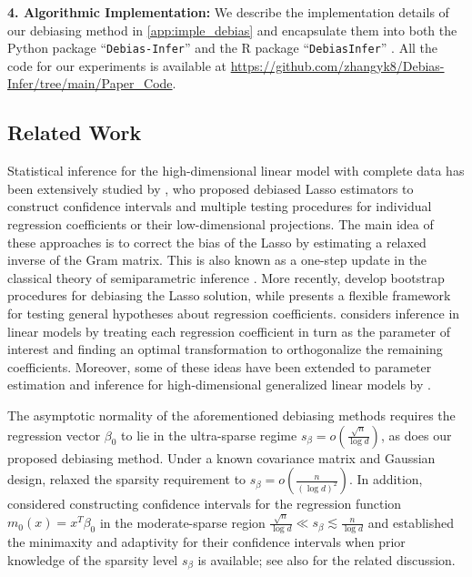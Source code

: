 \documentclass[ejsv2,noshowframe]{imsart}
\theoremstyle{plain}
\theoremstyle{definition}
\theoremstyle{remark}
\begin{document}
{\bf 4. Algorithmic Implementation:} We describe the implementation details of our debiasing method in \autoref{app:imple_debias} and encapsulate them into both the Python package ``\texttt{Debias-Infer}'' and the R package ``\texttt{DebiasInfer}'' \citep{DebiasInfer}. All the code for our experiments is available at \url{https://github.com/zhangyk8/Debias-Infer/tree/main/Paper_Code}. 

\subsection{Related Work}
\label{subsec:related_works}

Statistical inference for the high-dimensional linear model with complete data has been extensively studied by \cite{zhang2014confidence,van2014asymptotically,javanmard2014confidence,javanmard2014hypothesis,javanmard2018debiasing,buhlmann2013statistical,ning2017,athey2018approximate,zhu2018linear,cai2021optimal,bellec2022biasing}, who proposed debiased Lasso estimators to construct confidence intervals and multiple testing procedures for individual regression coefficients or their low-dimensional projections. The main idea of these approaches is to correct the bias of the Lasso by estimating a relaxed inverse of the Gram matrix. This is also known as a one-step update in the classical theory of semiparametric inference \citep{VDV2000}. More recently, \cite{zhang2017simultaneous,sai2020debiasing} develop bootstrap procedures for debiasing the Lasso solution, while \cite{javanmard2020flexible} presents a flexible framework for testing general hypotheses about regression coefficients. \cite{battey2023inference} considers inference in linear models by treating each regression coefficient in turn as the parameter of interest and finding an optimal transformation to orthogonalize the remaining coefficients. Moreover, some of these ideas have been extended to parameter estimation and inference for high-dimensional generalized linear models by \cite{belloni2016post,guo2016tests,xia2020revisit,shi2021statistical,guo2021inference,ma2021global,cai2023statistical}.

The asymptotic normality of the aforementioned debiasing methods requires the regression vector $\beta_0$ to lie in the ultra-sparse regime $s_{\beta}=o\left(\frac{\sqrt{n}}{\log d}\right)$, as does our proposed debiasing method. Under a known covariance matrix and Gaussian design, \cite{javanmard2018debiasing} relaxed the sparsity requirement to $s_{\beta} =o\left(\frac{n}{(\log d)^2}\right)$. In addition, \cite{cai2016confidence} considered constructing confidence intervals for the regression function $m_0(x)=x^T\beta_0$ in the moderate-sparse region $\frac{\sqrt{n}}{\log d} \ll s_{\beta} \lesssim \frac{n}{\log d}$ and established the minimaxity and adaptivity for their confidence intervals when prior knowledge of the sparsity level $s_{\beta}$ is available; see also \cite{nickl2013confidence,cai2018accuracy} for the related discussion.
\end{document}
